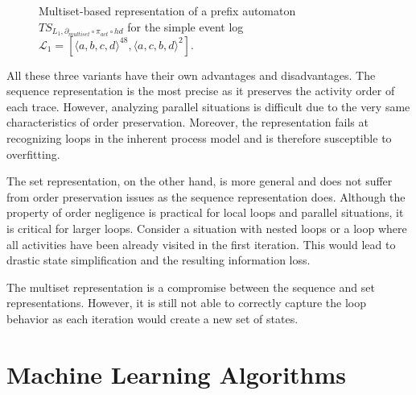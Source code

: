 \begin{figure}[H]
    \centering
    \caption{Multiset-based representation of a prefix automaton $\mathit{TS}_{L_1, \partial_{multiset} \circ \pi_{act} \circ \mathit{hd}}$ for the simple event log $\mathcal{L}_1 = [ \langle a, b, c, d \rangle ^{48}, \langle a, c, b, d \rangle^2 ]$.}
    \label{fig:example_prefix_automaton_multiset}
\end{figure}

All these three variants have their own advantages and disadvantages. The sequence representation is the most precise as it preserves the activity order of each trace. However, analyzing parallel situations is difficult due to the very same characteristics of order preservation. Moreover, the representation fails at recognizing loops in the inherent process model and is therefore susceptible to overfitting.

The set representation, on the other hand, is more general and does not suffer from order preservation issues as the sequence representation does. Although the property of order negligence is practical for local loops and parallel situations, it is critical for larger loops. Consider a situation with nested loops or a loop where all activities have been already visited in the first iteration. This would lead to drastic state simplification and the resulting information loss.
 
The multiset representation is a compromise between the sequence and set representations. However, it is still not able to correctly capture the loop behavior as each iteration would create a new set of states.

\section{Machine Learning Algorithms}

